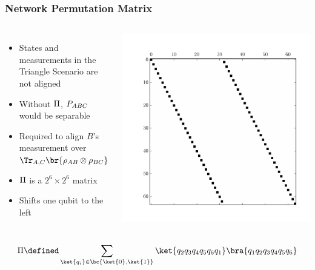 \documentclass[
    hyperref={bookmarks=false},%
    xcolor={dvipsnames},
]{beamer}
\begin{document}
\begin{frame}
    \frametitle{Network Permutation Matrix}
    \begin{columns}
        \begin{itemize}
            \item States and measurements in the Triangle Scenario are not aligned
            \item Without $\Pi$, $\prob[ABC]$ would be separable
            \item Required to align $B$'s measurement over $\Tr_{A,C}\br{\rho_{AB} \otimes \rho_{BC}}$
            \item $\Pi$ is a $2^6 \times 2^6$ matrix
            \item Shifts one qubit to the left
        \end{itemize}
            \includegraphics[trim={1.0cm 1.2cm 1.0cm 1cm},clip,width=1.0\textwidth]{../../figures/perm_mtrx.pdf}
    \end{columns}
    \[ \netperm \defined \sum_{\ket{q_i} \in \bc{\ket{0}, \ket{1}}}\ket{q_2q_3q_4q_5q_6q_1}\bra{q_1q_2q_3q_4q_5q_6} \]
\end{frame}
\end{document}
